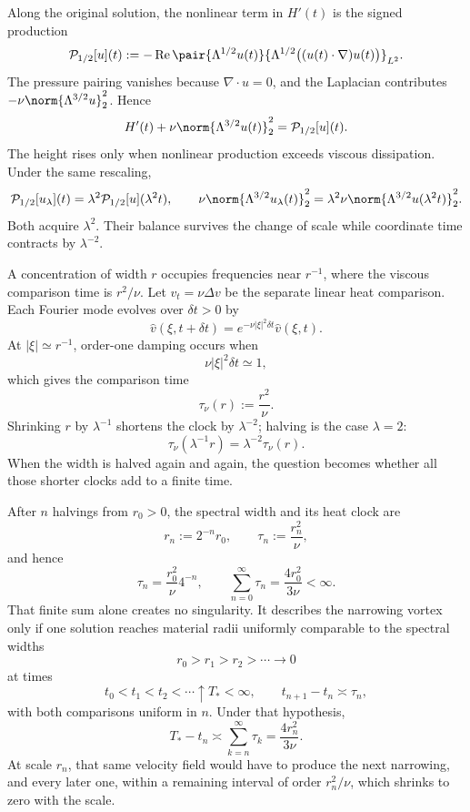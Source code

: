 Along the original solution, the nonlinear term in \(H'(t)\) is the signed production
\[
  \mathcal P_{1/2}[u](t)
  :=
  -\operatorname{Re}
  \pair
    {\Lambda^{1/2}u(t)}
    {\Lambda^{1/2}\bigl((u(t)\cdot\nabla)u(t)\bigr)}_{L^2}.
\]
The pressure pairing vanishes because \(\nabla\cdot u=0\), and the Laplacian contributes \(-\nu\norm{\Lambda^{3/2}u}_2^2\). Hence
\[
  H'(t)
  +
  \nu\norm{\Lambda^{3/2}u(t)}_2^2
  =
  \mathcal P_{1/2}[u](t).
\]
The height rises only when nonlinear production exceeds viscous dissipation. Under the same rescaling,
\[
  \mathcal P_{1/2}[u_\lambda](t)
  =
  \lambda^2\mathcal P_{1/2}[u](\lambda^2t),
  \qquad
  \nu\norm{\Lambda^{3/2}u_\lambda(t)}_2^2
  =
  \lambda^2\nu\norm{\Lambda^{3/2}u(\lambda^2t)}_2^2.
\]
Both acquire \(\lambda^2\). Their balance survives the change of scale while coordinate time contracts by \(\lambda^{-2}\).


A concentration of width \(r\) occupies frequencies near \(r^{-1}\), where the viscous comparison time is \(r^2/\nu\). Let \(v_t=\nu\Delta v\) be the separate linear heat comparison. Each Fourier mode evolves over \(\delta t>0\) by
\[
  \widehat v(\xi,t+\delta t)
  =
  e^{-\nu|\xi|^2\delta t}\widehat v(\xi,t).
\]
At \(|\xi|\simeq r^{-1}\), order-one damping occurs when
\[
  \nu|\xi|^2\delta t\simeq1,
\]
which gives the comparison time
\[
  \tau_\nu(r)
  :=
  \frac{r^2}{\nu}.
\]
Shrinking \(r\) by \(\lambda^{-1}\) shortens the clock by \(\lambda^{-2}\); halving is the case \(\lambda=2\):
\[
  \tau_\nu(\lambda^{-1}r)
  =
  \lambda^{-2}\tau_\nu(r).
\]
When the width is halved again and again, the question becomes whether all those shorter clocks add to a finite time.


After \(n\) halvings from \(r_0>0\), the spectral width and its heat clock are
\[
  r_n:=2^{-n}r_0,
  \qquad
  \tau_n:=\frac{r_n^2}{\nu},
\]
and hence
\[
  \tau_n
  =
  \frac{r_0^2}{\nu}4^{-n},
  \qquad
  \sum_{n=0}^{\infty}\tau_n
  =
  \frac{4r_0^2}{3\nu}
  <
  \infty.
\]
That finite sum alone creates no singularity. It describes the narrowing vortex only if one \NavierStokes{} solution reaches material radii uniformly comparable to the spectral widths
\[
  r_0>r_1>r_2>\cdots\longrightarrow0
\]
at times
\[
  t_0<t_1<t_2<\cdots\uparrow T_*<\infty,
  \qquad
  t_{n+1}-t_n\asymp\tau_n,
\]
with both comparisons uniform in \(n\). Under that hypothesis,
\[
  T_*-t_n
  \asymp
  \sum_{k=n}^{\infty}\tau_k
  =
  \frac{4r_n^2}{3\nu}.
\]
At scale \(r_n\), that same velocity field would have to produce the next narrowing, and every later one, within a remaining interval of order \(r_n^2/\nu\), which shrinks to zero with the scale.
